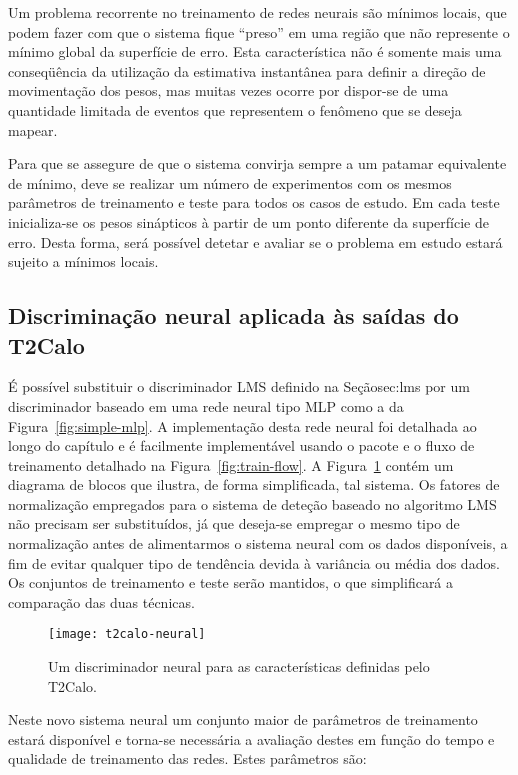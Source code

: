 Um problema recorrente no treinamento de redes neurais são mínimos locais, que
podem fazer com que o sistema fique ``preso'' em uma região que não represente
o mínimo global da superfície de erro. Esta característica não é somente mais
uma conseqüência da utilização da estimativa instantânea para definir a
direção de movimentação dos pesos, mas muitas vezes ocorre por dispor-se de
uma quantidade limitada de eventos que representem o fenômeno que se deseja
mapear.

Para que se assegure de que o sistema convirja sempre a um patamar equivalente
de mínimo, deve se realizar um número de experimentos com os mesmos parâmetros
de treinamento e teste para todos os casos de estudo. Em cada teste
inicializa-se os pesos sinápticos à partir de um ponto diferente da superfície
de erro. Desta forma, será possível detetar e avaliar se o problema em estudo
estará sujeito a mínimos locais.

\subsection{Discriminação neural aplicada às saídas do T2Calo}

É possível substituir o discriminador LMS definido na Seção{sec:lms} por um
discriminador baseado em uma rede neural tipo MLP como a da
Figura~\ref{fig:simple-mlp}. A implementação desta rede neural foi detalhada
ao longo do capítulo e é facilmente implementável usando o pacote
 e o fluxo de treinamento detalhado na
Figura~\ref{fig:train-flow}. A Figura~\ref{fig:t2calo-neural} contém um
diagrama de blocos que ilustra, de forma simplificada, tal sistema. Os fatores
de normalização empregados para o sistema de deteção baseado no algoritmo LMS
não precisam ser substituídos, já que deseja-se empregar o mesmo tipo de
normalização antes de alimentarmos o sistema neural com os dados disponíveis,
a fim de evitar qualquer tipo de tendência devida à variância ou média dos
dados. Os conjuntos de treinamento e teste serão mantidos, o que simplificará
a comparação das duas técnicas.

\begin{figure}
\begin{center}
\texttt{[image: t2calo-neural]}
\end{center}
\caption{Um discriminador neural para as características definidas pelo
T2Calo.}
\label{fig:t2calo-neural}
\end{figure}

Neste novo sistema neural um conjunto maior de parâmetros de treinamento
estará disponível e torna-se necessária a avaliação destes em função do tempo
e qualidade de treinamento das redes. Estes parâmetros são:

